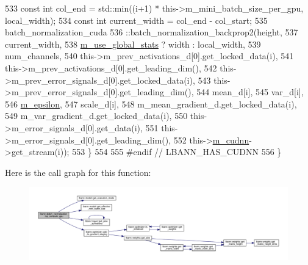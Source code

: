 \begin{DoxyCode}
533       \textcolor{keyword}{const} \textcolor{keywordtype}{int} col\_end = std::min((i+1) * this->m\_mini\_batch\_size\_per\_gpu, local\_width);
534       \textcolor{keyword}{const} \textcolor{keywordtype}{int} current\_width = col\_end - col\_start;
535       batch\_normalization\_cuda
536         ::batch\_normalization\_backprop2(height,
537                                         current\_width,
538                                         \hyperlink{classlbann_1_1batch__normalization_a0a33289150c01899f4b7ef2980771899}{m\_use\_global\_stats} ? width : local\_width,
539                                         num\_channels,
540                                         this->m\_prev\_activations\_d[0].get\_locked\_data(i),
541                                         this->m\_prev\_activations\_d[0].get\_leading\_dim(),
542                                         this->m\_prev\_error\_signals\_d[0].get\_locked\_data(i),
543                                         this->m\_prev\_error\_signals\_d[0].get\_leading\_dim(),
544                                         mean\_d[i],
545                                         var\_d[i],
546                                         \hyperlink{classlbann_1_1batch__normalization_ab82e74f905b7a117d9940f8542451e37}{m\_epsilon},
547                                         scale\_d[i],
548                                         m\_mean\_gradient\_d.get\_locked\_data(i),
549                                         m\_var\_gradient\_d.get\_locked\_data(i),
550                                         this->m\_error\_signals\_d[0].get\_data(i),
551                                         this->m\_error\_signals\_d[0].get\_leading\_dim(),
552                                         this->\hyperlink{classlbann_1_1Layer_a08dbb94239e3b8c96329786c57c72e21}{m\_cudnn}->get\_stream(i));
553     \}
554 
555 \textcolor{preprocessor}{  #endif // LBANN\_HAS\_CUDNN}
556   \}
\end{DoxyCode}
Here is the call graph for this function\+:\nopagebreak
\begin{figure}[H]
\begin{center}
\leavevmode
\includegraphics[width=350pt]{classlbann_1_1batch__normalization_a7d48ad1531825fc9745c77f9ae5f68d6_cgraph}
\end{center}
\end{figure}
